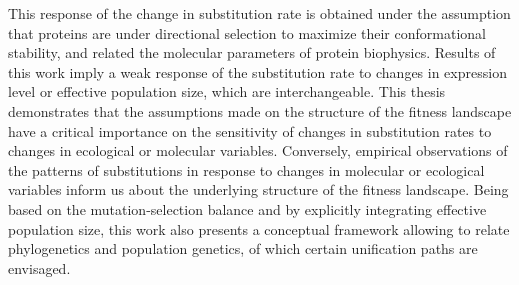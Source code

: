 This response of the change in substitution rate is obtained under the assumption that proteins are under directional selection to maximize their conformational stability, and related the molecular parameters of protein biophysics.
Results of this work imply a weak response of the substitution rate to changes in expression level or effective population size, which are interchangeable.
This thesis demonstrates that the assumptions made on the structure of the fitness landscape have a critical importance on the sensitivity of changes in substitution rates to changes in ecological or molecular variables.
Conversely, empirical observations of the patterns of substitutions in response to changes in molecular or ecological variables inform us about the underlying structure of the fitness landscape.
Being based on the mutation-selection balance and by explicitly integrating effective population size, this work also presents a conceptual framework allowing to relate phylogenetics and population genetics, of which certain unification paths are envisaged.

